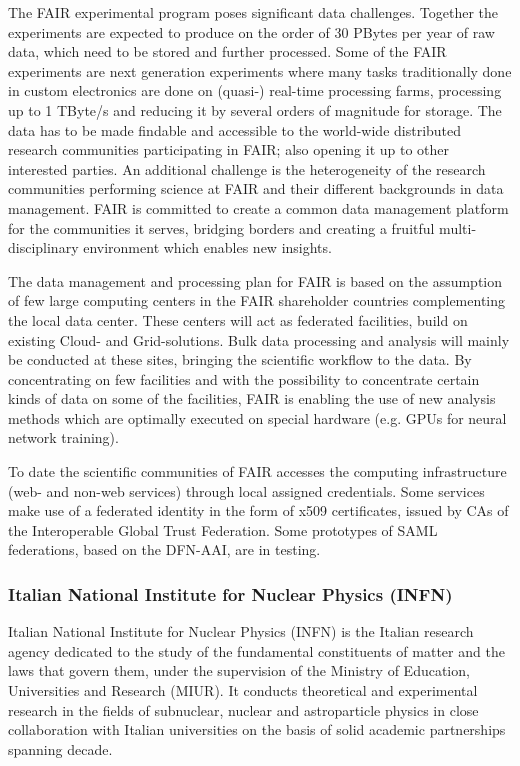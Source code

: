 \documentclass[fleqn,10pt]{wlscirep}
\begin{document}
{The FAIR experimental program poses significant data challenges. Together the experiments are expected to produce on the order of 30 PBytes per year of raw data, which need to be stored and further processed. Some of the FAIR experiments are next generation experiments where many tasks traditionally done in custom electronics are done on (quasi-) real-time processing farms, processing up to 1 TByte/s and reducing it by several orders of magnitude for storage. The data has to be made findable and accessible to the world-wide distributed research communities participating in FAIR; also opening it up to other interested parties. An additional challenge is the heterogeneity of the research communities performing science at FAIR and their different backgrounds in data management. FAIR is committed to create a common data management platform for the communities it serves, bridging borders and creating a fruitful multi-disciplinary environment which enables new insights.
 
The data management and processing plan for FAIR is based on the assumption of few large computing centers in the FAIR shareholder countries complementing the local data center. These centers will act as federated facilities, build on existing Cloud- and Grid-solutions. Bulk data processing and analysis will mainly be conducted at these sites, bringing the scientific workflow to the data. By concentrating on few facilities and with the possibility to concentrate certain kinds of data on some of the facilities, FAIR is enabling the use of new analysis methods which are optimally executed on special hardware (e.g. GPUs for neural network training).
 
To date the scientific communities of FAIR accesses the computing infrastructure (web- and non-web services) through local assigned credentials. Some services make use of a federated identity in the form of x509 certificates, issued by CAs of the Interoperable Global Trust Federation. Some prototypes of SAML federations, based on the DFN-AAI, are in testing.

\subsubsection{Italian National Institute for Nuclear Physics (INFN)}
Italian National Institute for Nuclear Physics (INFN) is the Italian research agency dedicated to the study of the fundamental constituents of matter and the laws that govern them, under the supervision of the Ministry of Education, Universities and Research (MIUR). It conducts theoretical and experimental research in the fields of subnuclear, nuclear and astroparticle physics  in close collaboration with Italian universities on the basis of solid academic partnerships spanning decade.

}
\end{document}
